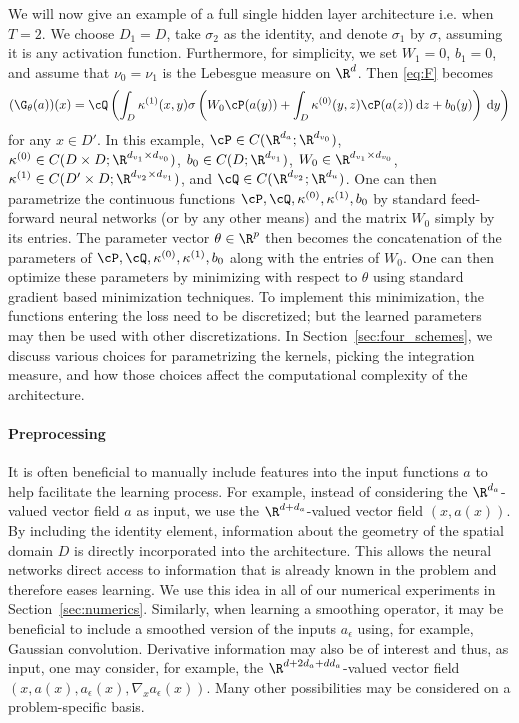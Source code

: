 We will now give an example of a full single hidden layer architecture i.e. when \(T=2\). We choose \(D_1 = D\), take \(\sigma_2\) as the identity,
and denote \(\sigma_1\) by \(\sigma\), assuming it is any activation function. Furthermore, for simplicity, we set \(W_1 = 0\), \(b_1 = 0\), and assume that \(\nu_0 = \nu_1\) is the Lebesgue measure on \(\R^d\). Then  \eqref{eq:F} becomes
\begin{equation}
    \label{eq:singlehiddenlayer}
    (\G_\theta(a))(x) = \cQ \left (\int_D \kappa^{(1)}(x,y) \sigma \left ( W_0 \cP(a(y)) + \int_D \kappa^{(0)}(y,z) \cP (a(z)) \: \text{d}z + b_0(y) \right ) \: \text{d}y \right)
\end{equation}
for any \(x \in D'\). In this example, \(\cP \in C(\R^{d_a}; \R^{d_{v_0}})\),  \(\kappa^{(0)} \in C(D \times D; \R^{d_{v_1} \times d_{v_0}})\), \(b_0 \in C(D; \R^{d_{v_1}})\), \(W_0 \in \R^{d_{v_1} \times d_{v_0}}\), \(\kappa^{(1)} \in C(D' \times D; \R^{d_{v_2} \times d_{v_1}})\), and \(\cQ \in C(\R^{d_{v_2}}; \R^{d_u})\). One can then parametrize the continuous functions \(\cP,\cQ,\kappa^{(0)},\kappa^{(1)},b_0\) by standard feed-forward neural networks (or by any other means) and the matrix \(W_0\) simply by its entries. The parameter vector \(\theta \in \R^p\) then becomes the concatenation of the parameters of \(\cP,\cQ,\kappa^{(0)},\kappa^{(1)},b_0\) along with the entries of \(W_0\). One can then optimize these parameters by minimizing with respect to \(\theta\) using standard gradient based minimization techniques. To implement this minimization, the functions
entering the loss need to be discretized; but the learned parameters may then be used with other discretizations. In Section~\ref{sec:four_schemes}, we discuss various choices for parametrizing the kernels, picking the integration measure,  
and how those choices affect the computational complexity of the architecture.

\paragraph{Preprocessing} It is often beneficial to manually include features into the input functions \(a\) to help facilitate the learning process. For example, instead of considering the \(\R^{d_a}\)-valued vector field \(a\) as input, we use the \(\R^{d+ d_a}\)-valued vector field \((x,a(x))\). By including the identity element, information about the geometry of the spatial domain \(D\) is directly incorporated into the architecture. This allows the neural networks direct access to information that is already known in the problem and therefore eases learning. We use this idea in all of our numerical experiments in Section~\ref{sec:numerics}. Similarly, when learning a smoothing operator, it may be beneficial to include a smoothed version of the inputs \(a_\epsilon\) using, for example, Gaussian convolution. Derivative information may also be of interest and thus, as input, one may consider, for example, the \(\R^{d + 2d_a + dd_a}\)-valued vector field \((x,a(x),a_\epsilon(x),\nabla_x a_\epsilon (x))\). Many other possibilities may be considered on a problem-specific basis. 



